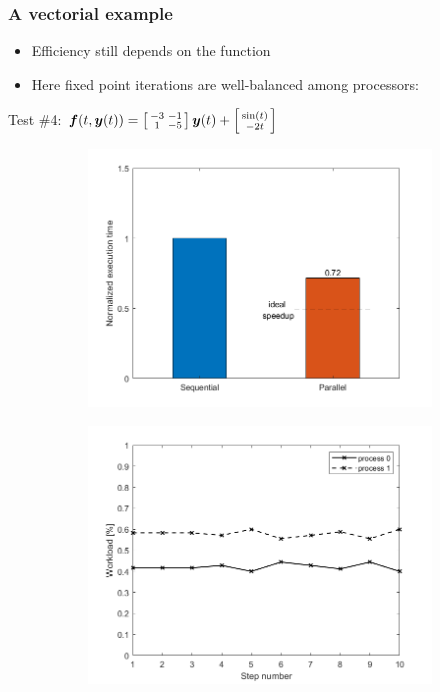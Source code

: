 \documentclass{beamer}
\begin{document}
\begin{frame} %
	\frametitle{A vectorial example}
	\begin{itemize}
		\item Efficiency still depends on the function
		\item Here fixed point iterations are well-balanced among processors:
	\end{itemize}	
	\begin{center}
		Test \#4: \quad
		$\boldsymbol f(t,\boldsymbol y(t)) =
		\left[\begin{smallmatrix} -3 & -1 \\ 1 & -5 \end{smallmatrix}\right]
		\boldsymbol y(t) +
		\left[\begin{smallmatrix} \sin(t) \\ -2t \end{smallmatrix}\right]$
	\end{center}
	\begin{figure}
		\begin{subfigure}{.5\textwidth}
			\includegraphics[width=\linewidth]{etc/test_4_speedup.jpeg}
		\end{subfigure}%
		\begin{subfigure}{.5\textwidth}
			\includegraphics[width=\linewidth]{etc/test_4_workload.jpeg}

\end{subfigure}
\end{figure}
\end{frame}
\end{document}
